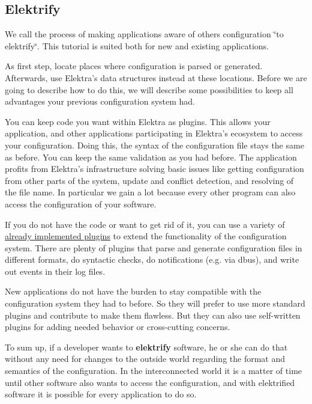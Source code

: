 \subsection*{Elektrify}

We call the process of making applications aware of other\textquotesingle{}s configuration \char`\"{}to elektrify\char`\"{}. This tutorial is suited both for new and existing applications.

As first step, locate places where configuration is parsed or generated. Afterwards, use Elektra’s data structures instead at these locations. Before we are going to describe how to do this, we will describe some possibilities to keep all advantages your previous configuration system had.

You can keep code you want within Elektra as plugins. This allows your application, and other applications participating in Elektra’s ecosystem to access your configuration. Doing this, the syntax of the configuration file stays the same as before. You can keep the same validation as you had before. The application profits from Elektra’s infrastructure solving basic issues like getting configuration from other parts of the system, update and conflict detection, and resolving of the file name. In particular we gain a lot because every other program can also access the configuration of your software.

If you do not have the code or want to get rid of it, you can use a variety of \hyperlink{src_plugins_README_md}{already implemented plugins} to extend the functionality of the configuration system. There are plenty of plugins that parse and generate configuration files in different formats, do syntactic checks, do notifications (e.\+g. via dbus), and write out events in their log files.

New applications do not have the burden to stay compatible with the configuration system they had to before. So they will prefer to use more standard plugins and contribute to make them flawless. But they can also use self-\/written plugins for adding needed behavior or cross-\/cutting concerns.

To sum up, if a developer wants to {\bfseries elektrify} software, he or she can do that without any need for changes to the outside world regarding the format and semantics of the configuration. In the interconnected world it is a matter of time until other software also wants to access the configuration, and with elektrified software it is possible for every application to do so.

